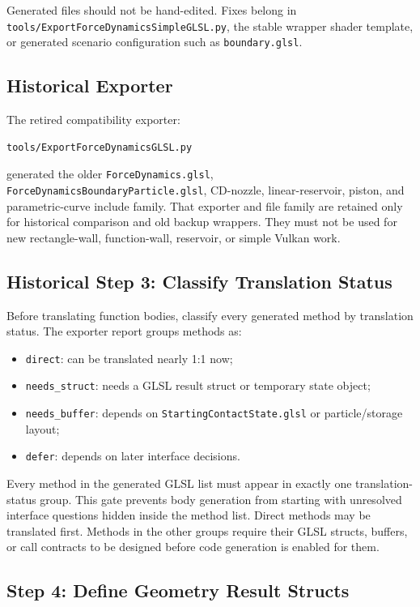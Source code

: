 Generated files should not be hand-edited.  Fixes belong in
\texttt{tools/ExportForceDynamicsSimpleGLSL.py}, the stable wrapper shader
template, or generated scenario configuration such as \texttt{boundary.glsl}.

\subsection{Historical Exporter}

The retired compatibility exporter:
\begin{verbatim}
tools/ExportForceDynamicsGLSL.py
\end{verbatim}
generated the older \texttt{ForceDynamics.glsl},
\texttt{ForceDynamicsBoundaryParticle.glsl}, CD-nozzle, linear-reservoir,
piston, and parametric-curve include family.  That exporter and file family
are retained only for historical comparison and old backup wrappers.  They
must not be used for new rectangle-wall, function-wall, reservoir, or simple
Vulkan work.

\subsection{Historical Step 3: Classify Translation Status}

Before translating function bodies, classify every generated method by
translation status.  The exporter report groups methods as:
\begin{itemize}
    \item \texttt{direct}: can be translated nearly 1:1 now;
    \item \texttt{needs\_struct}: needs a GLSL result struct or temporary state
    object;
    \item \texttt{needs\_buffer}: depends on
    \texttt{StartingContactState.glsl} or particle/storage layout;
    \item \texttt{defer}: depends on later interface decisions.
\end{itemize}

Every method in the generated GLSL list must appear in exactly one
translation-status group.  This gate prevents body generation from starting
with unresolved interface questions hidden inside the method list.  Direct
methods may be translated first.  Methods in the other groups require their
GLSL structs, buffers, or call contracts to be designed before code generation
is enabled for them.

\subsection{Step 4: Define Geometry Result Structs}

